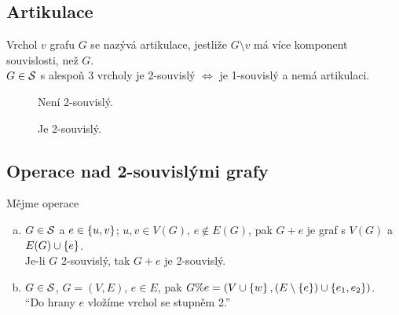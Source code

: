 \newpage
\subsection{Artikulace}\label{artikulace}
Vrchol $v$ grafu $G$ se nazývá artikulace, jestliže $G \setminus v$ má více komponent souvislosti, než $G$.\\
 $G \in \S$ s alespoň 3 vrcholy je 2-souvislý $\iff$ je 1-souvislý a nemá artikulaci.
\begin{figure}[H]
    \centering
    \begin{minipage}[c]{0.3\textwidth}
        \begin{figure}[H]
        \end{figure}
        Není 2-souvislý.
    \end{minipage}%
    \hspace{0.1\textwidth}
    \begin{minipage}[c]{0.3\textwidth}
        \begin{figure}[H]
        \end{figure}
        Je 2-souvislý.
    \end{minipage}
\end{figure}

\subsection{Operace nad 2-souvislými grafy}
Mějme operace
\begin{enumerate}[(a)]
    \item $G \in \S$ a $e \in \bc{u,v}$; $u, v \in V(G)$, $e \not\in E(G)$, pak
    $G + e$ je graf s $V(G)$ a $E(G) \cup \bc{e}$. \\ Je-li $G$ 2-souvislý, tak $G+e$ je 2-souvislý.
    \item $G \in \S$, $G = (V,E)$, $e \in E$, pak
    $G \% e = \left(V \cup \bc{w}, (E \setminus \bc{e}) \cup \bc{e_1, e_2}\right)$. \\
    \enquote{Do hrany $e$ vložíme vrchol se stupněm 2.}
\end{enumerate}

